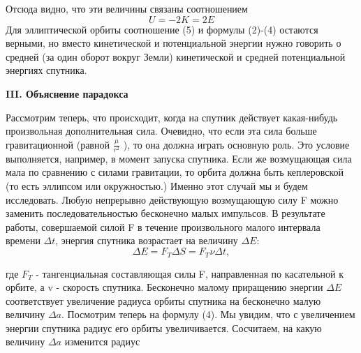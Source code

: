 \leftskip=0.3cm \rightskip=1cm
\fontsize{14}{10}\selectfont
\begin{minipage}{8cm}
Отсюда видно, что эти величины связаны соотношением 
\begin{equation}
	U = -2K = 2E
\end{equation}
 Для эллиптической орбиты соотношение (5) и формулы (2)-(4) остаются верными, но вместо кинетической и потенциальной энергии нужно говорить о средней (за один оборот вокруг Земли) кинетической и средней потенциальной энергиях спутника. 

\begin{center} 
\textbf{III. Объяснение парадокса}
\end{center}
\hspace{10mm}Рассмотрим теперь, что происходит, когда на спутник действует какая-нибудь произвольная дополнительная сила. Очевидно, что если эта сила больше гравитационной (равной $\frac{\mu}{r^2}$ ), то она должна играть основную роль. Это условие выполняется, например, в момент запуска спутника. Если же возмущающая сила мала по сравнению с силами гравитации, то орбита должна быть кеплеровской (то есть эллипсом или окружностью.) Именно этот случай мы и будем исследовать. \hspace{10mm}Любую непрерывно действующую возмущающую силу F можно заменить последовательностью бесконечно малых импульсов. В результате работы, совершаемой силой F в течение произвольного малого интервала времени $\Delta t$, энергия спутника возрастает на величину $\Delta E$:
 \begin{equation}
 	\Delta E = F_T \Delta S = F_T \nu \Delta t,
 \end{equation}
  
 где $F_T$ - тангенциальная составляющая силы F, направленная по касательной к орбите, а v - скорость спутника. Бесконечно малому приращению энергии $\Delta E$ соответствует увеличение радиуса орбиты спутника на бесконечно малую величину $\Delta a$. Посмотрим теперь на формулу (4). Мы увидим, что с увеличением энергии спутника радиус его орбиты увеличивается. Сосчитаем, на какую величину $\Delta a$ изменится радиус 
\end{minipage}

